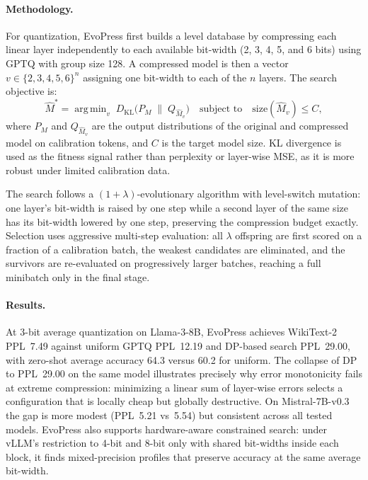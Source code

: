 \paragraph{Methodology.}
For quantization, EvoPress first builds a level database by compressing each linear layer independently to each available bit-width (2, 3, 4, 5, and 6 bits) using GPTQ with group size 128. A compressed model is then a vector $v \in \{2,3,4,5,6\}^n$ assigning one bit-width to each of the $n$ layers. The search objective is:
\begin{equation}
  \hat{M}^* = \operatorname{arg\,min}_{v} \; D_{\mathrm{KL}}
    \bigl(P_M \;\|\; Q_{\hat{M}_v}\bigr)
    \quad \text{subject to} \quad
    \mathrm{size}(\hat{M}_v) \leq C,
\end{equation}
where $P_M$ and $Q_{\hat{M}_v}$ are the output distributions of the original and compressed model on calibration tokens, and $C$ is the target model size. KL divergence is used as the fitness signal rather than perplexity or layer-wise MSE, as it is more robust under limited calibration data.

The search follows a $(1+\lambda)$-evolutionary algorithm with level-switch mutation: one layer's bit-width is raised by one step while a second layer of the same size has its bit-width lowered by one step, preserving the compression budget exactly. Selection uses aggressive multi-step evaluation: all $\lambda$ offspring are first scored on a fraction of a calibration batch, the weakest candidates are eliminated, and the survivors are re-evaluated on progressively larger batches, reaching a full minibatch only in the final stage.


\paragraph{Results.}
At 3-bit average quantization on Llama-3-8B, EvoPress achieves WikiText-2 PPL~7.49 against uniform GPTQ PPL~12.19 and DP-based search PPL~29.00, with zero-shot average accuracy 64.3 versus 60.2 for uniform. The collapse of DP to PPL~29.00 on the same model illustrates precisely why error monotonicity fails at extreme compression: minimizing a linear sum of layer-wise errors selects a configuration that is locally cheap but globally destructive. On Mistral-7B-v0.3 the gap is more modest (PPL~5.21 vs~5.54) but consistent across all tested models. EvoPress also supports hardware-aware constrained search: under vLLM's restriction to 4-bit and 8-bit only with shared bit-widths inside each block, it finds mixed-precision profiles that preserve accuracy at the same average bit-width.

